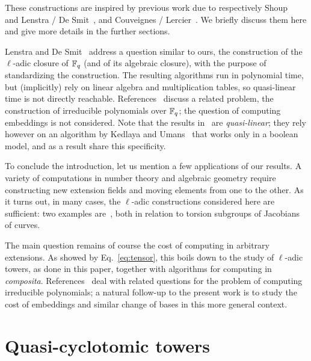 \documentclass{sig-alternate}
\begin{document}
These constructions are inspired by previous work due to respectively
Shoup~\cite{Shoup90,shoup94} and Lenstra / De
Smit~\cite{lenstra+desmit08-stdmodels}, and Couveignes /
Lercier~\cite{couveignes+lercier11}. We briefly discuss them here and
give more details in the further sections.

Lenstra and De Smit~\cite{lenstra+desmit08-stdmodels} address a
question similar to ours, the construction of the $\ell$-adic closure
of $\mathbb{F}_q$ (and of its algebraic closure), with the purpose of
standardizing the construction. The resulting algorithms run in
polynomial time, but (implicitly) rely on linear algebra and
multiplication tables, so quasi-linear time is not directly reachable.
References~\cite{Shoup90,shoup94,couveignes+lercier11} discuss a
related problem, the construction of irreducible polynomials over
$\mathbb{F}_q$; the question of computing embeddings is not considered.  Note
that the results in~\cite{couveignes+lercier11} are {\em
  quasi-linear}; they rely however on an algorithm by Kedlaya and
Umans~\cite{KeUm11} that works only in a boolean model, and as a
result share this specificity.

To conclude the introduction, let us mention a few applications of our
results. A variety of computations in number theory and algebraic
geometry require constructing new extension fields and moving elements
from one to the other. As it turns out, in many cases, the $\ell$-adic
constructions considered here are sufficient: two examples
are~\cite{df10,GaSc12}, both in relation to torsion subgroups of
Jacobians of curves.

The main question remains of course the cost of computing in arbitrary
extensions. As showed by Eq.~\eqref{eq:tensor}, this boils down to the
study of $\ell$-adic towers, as done in this paper, together with
algorithms for computing in \emph{composita}.
References~\cite{Shoup90,shoup94,couveignes+lercier11} deal with
related questions for the problem of computing irreducible polynomials;
a natural follow-up to the present work is to study the cost of
embeddings and similar change of bases in this more general context.


\section{Quasi-cyclotomic towers}
\label{sec:LDtower}
\end{document}
